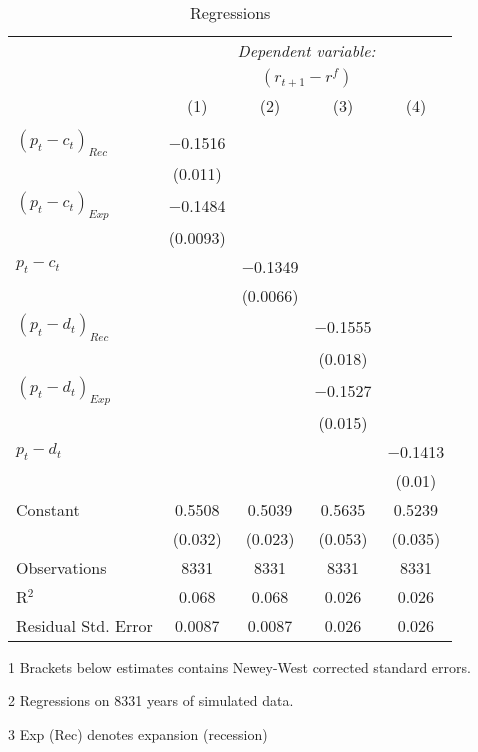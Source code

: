 \begin{table}[H]
\centering   
  \caption{Regressions}           
  \label{tab:regress}     
  \begin{threeparttable}
\begin{tabular}{@{\hspace{5pt}}l@{\hspace{5pt}}cccc} 
\toprule 
 & \multicolumn{4}{c}{\textit{Dependent variable:}} \\ 
 & \multicolumn{4}{c}{$\left(r_{t+1}-r^f\right)$} \\ 
 \cmidrule(rr){2-5}
 & (1)   &   (2) &   (3) &  (4)\\ 
\midrule  
\\[-2.1ex] $\left( p_t - c_t \right)_{Rec}$ & $-$0.1516& &  \\ 
  & (0.011) & & & \\ 
 \addlinespace 
  $\left( p_t - c_t \right)_{Exp}$ & $-$0.1484 & &  \\ 
  & (0.0093) & & &\\ 
 \addlinespace 
 $p_t - c_t$ &  & $-$0.1349 & & \\
 & & (0.0066) \\
 \addlinespace 
  $\left( p_t - d_t \right)_{Rec}$ & & & $-$0.1555&  \\ 
  & & & (0.018)    &\\ 
 \addlinespace 
  $\left( p_t - d_t \right)_{Exp}$ & & & $-$0.1527&  \\ 
  &  & & (0.015) &\\ 
 \addlinespace 
 $p_t - d_t$ & & & & $-$0.1413 \\
 & & & &  (0.01)  \\
 \addlinespace 
 Constant &0.5508 &0.5039 &0.5635 &0.5239 \\ 
  &(0.032) &(0.023) &(0.053) &(0.035) \\ 
 \addlinespace 
\midrule  
Observations & 8331 & 8331 & 8331 &8331\\ 
R$^{2}$ &0.068 & 0.068 & 0.026 &0.026\\ 
Residual Std. Error &0.0087 & 0.0087 &0.026 & 0.026  \\ 
\bottomrule 
\end{tabular} 
\begin{tablenotes}
\footnotesize{
\item[1] Brackets below estimates contains Newey-West corrected standard errors. 
\item[2] Regressions on 8331 years of simulated data.
\item[3] Exp (Rec) denotes expansion (recession)
}
\end{tablenotes}
\end{threeparttable}
\end{table} 
